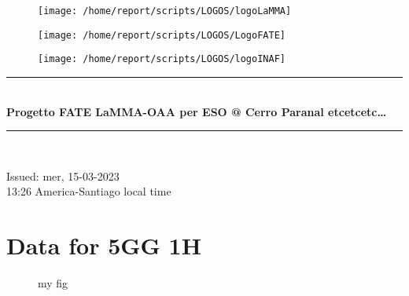 \documentclass[11pt,english]{article}
\newcommand{\HRule}{\rule{\linewidth}{0.5mm}}
\begin{document}
\begin{figure}
\begin{center}
\hspace{.5cm}
\parbox{5.5cm}{\texttt{[image: /home/report/scripts/LOGOS/logoLaMMA]}}
\hspace{.5cm}
\parbox{5.5cm}{\texttt{[image: /home/report/scripts/LOGOS/LogoFATE]}}
\hspace{.5cm}
\parbox{5.5cm}{\texttt{[image: /home/report/scripts/LOGOS/logoINAF]}}
\hspace{.1cm}
\vspace{1.2cm}
\end{center}
\end{figure}

\begin{center}
\HRule \\[0.4cm]
\Huge{\textbf{Progetto FATE LaMMA-OAA per ESO @ Cerro Paranal etcetcetc\ldots}}
\HRule \\[0.4cm]
\end{center}

\begin{center}
\vspace{2cm}\Huge{Issued: mer, 15-03-2023\\ 13:26 America-Santiago local time}
\end{center}


\clearpage
\section{Data for 5GG 1H}

\clearpage
\begin{figure}
\begin{minipage}{.5\linewidth}
\centering
{}
\end{minipage}%
\begin{minipage}{.5\linewidth}
\centering
{}
\end{minipage}\par\medskip
\centering
{}
\caption{my fig}
\label{fig:main}
\end{figure}
\end{document}
